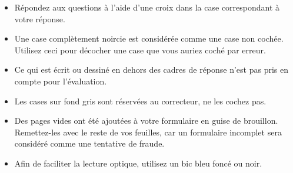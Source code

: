 \documentclass[11pt,french,a4paper]{article}
\begin{document}
{  \noindent\hrulefill{}
  \begin{itemize}[nosep]
    \item Répondez aux questions à l'aide d'une croix dans la case correspondant à votre réponse.
    \item Une case complètement noircie est considérée comme une case non cochée.
          Utilisez ceci pour décocher une case que vous auriez coché par erreur.
    \item Ce qui est écrit ou dessiné en dehors des cadres de réponse n'est pas pris en compte pour l'évaluation.
    \item Les cases sur fond gris sont réservées au correcteur, ne les cochez pas.
    \item Des pages vides ont été ajoutées à votre formulaire en guise de brouillon.
          Remettez-les avec le reste de vos feuilles, car un formulaire incomplet sera considéré comme une tentative de fraude.
    \item Afin de faciliter la lecture optique, utilisez un bic bleu foncé ou noir.
  \end{itemize}
  \noindent\hrulefill{}
  \vspace*{1.5em}





}
\end{document}
